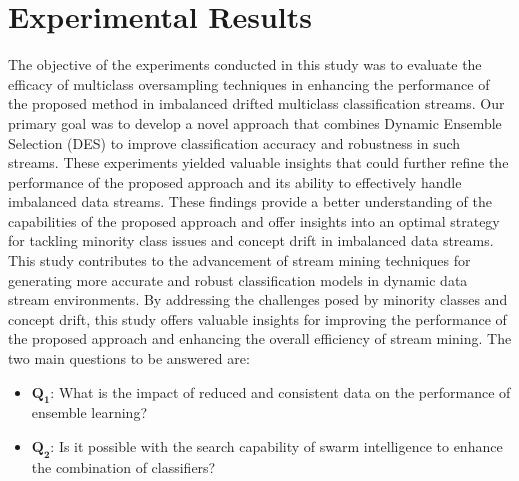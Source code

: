 %
%



\section{Experimental Results}
\label{sec:4_5_Expsetup}

The objective of the experiments conducted in this study was to evaluate the efficacy of multiclass oversampling techniques in enhancing the performance of the proposed method in imbalanced drifted multiclass classification streams. Our primary goal was to develop a novel approach that combines Dynamic Ensemble Selection (DES) to improve classification accuracy and robustness in such streams. These experiments yielded valuable insights that could further refine the performance of the proposed approach and its ability to effectively handle imbalanced data streams. These findings provide a better understanding of the capabilities of the proposed approach and offer insights into an optimal strategy for tackling minority class issues and concept drift in imbalanced data streams. This study contributes to the advancement of stream mining techniques for generating more accurate and robust classification models in dynamic data stream environments. By addressing the challenges posed by minority classes and concept drift, this study offers valuable insights for improving the performance of the proposed approach and enhancing the overall efficiency of stream mining. The two main questions to be answered are:

\begin{itemize}
  \setlength{\itemindent}{-.5in}
  
      \item $\pmb{Q_1}$: What is the impact of reduced and consistent data on the performance of ensemble learning?
      \item  $\pmb{Q_2}$: Is it possible with the search capability of swarm intelligence to enhance the combination of classifiers? 
  \end{itemize}

